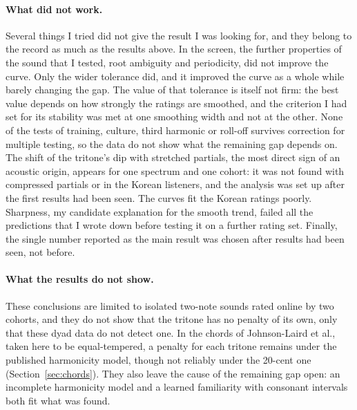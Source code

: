 \documentclass[11pt,a4paper]{article}
\begin{document}
\paragraph{What did not work.}
Several things I tried did not give the result I was looking for, and they belong to the
record as much as the results above. In the screen, the further properties of the sound that
I tested, root ambiguity and periodicity, did not improve the curve. Only the wider
tolerance did, and it improved the curve as a whole while barely changing the gap. The value
of that tolerance is itself not firm: the best value depends on how strongly the ratings are
smoothed, and the criterion I had set for its stability was met at one smoothing width and
not at the other. None of the tests of training, culture, third harmonic or roll-off
survives correction for multiple testing, so the data do not show what the remaining gap
depends on. The shift of the tritone's dip with stretched partials, the most direct sign of
an acoustic origin, appears for one spectrum and one cohort: it was not found with
compressed partials or in the Korean listeners, and the analysis was set up after the first
results had been seen. The curves fit the Korean ratings poorly. Sharpness, my candidate
explanation for the smooth trend, failed all the predictions that I wrote down before
testing it on a further rating set. Finally, the single number reported as the main result
was chosen after results had been seen, not before.

\paragraph{What the results do not show.}
These conclusions are limited to isolated two-note sounds rated online by two cohorts, and
they do not show that the tritone has no penalty of its own, only that these dyad data do
not detect one. In the chords of Johnson-Laird et al., taken here to be equal-tempered, a penalty for each
tritone remains under the published harmonicity model, though not reliably under the 20-cent
one (Section~\ref{sec:chords}). They also leave the cause of the remaining gap
open: an incomplete harmonicity model and a learned familiarity with consonant intervals
both fit what was found.
\end{document}
